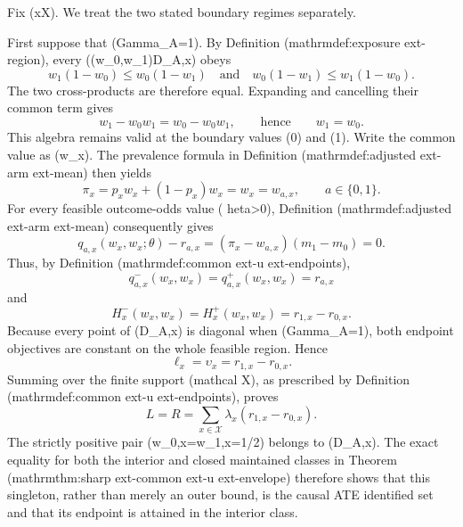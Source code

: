 Fix (x\in\mathcal X).  We treat the two stated boundary regimes separately.

First suppose that (Gamma_A=1).  By Definition (mathrm{def{:}exposure	ext{-}region}), every ((w_0,w_1)\in D_{A,x}) obeys
\[
w_1(1-w_0)\leq w_0(1-w_1)
\quad\text{and}\quad
w_0(1-w_1)\leq w_1(1-w_0).
\]
The two cross-products are therefore equal.  Expanding and cancelling their common term gives
\[
w_1-w_0w_1=w_0-w_0w_1,
\qquad\text{hence}\qquad
w_1=w_0.
\]
This algebra remains valid at the boundary values (0) and (1).  Write the common value as (w_x).  The prevalence formula in Definition (mathrm{def{:}adjusted	ext{-}arm	ext{-}mean}) then yields
\[
\pi_x=p_xw_x+(1-p_x)w_x=w_x=w_{a,x},
\qquad a\in\{0,1\}.
\]
For every feasible outcome-odds value (	heta>0), Definition (mathrm{def{:}adjusted	ext{-}arm	ext{-}mean}) consequently gives
\[
q_{a,x}(w_x,w_x;\theta)-r_{a,x}
=(\pi_x-w_{a,x})(m_1-m_0)=0.
\]
Thus, by Definition (mathrm{def{:}common	ext{-}u	ext{-}endpoints}),
\[
q^-_{a,x}(w_x,w_x)=q^+_{a,x}(w_x,w_x)=r_{a,x}
\]
and
\[
H^-_x(w_x,w_x)=H^+_x(w_x,w_x)=r_{1,x}-r_{0,x}.
\]
Because every point of (D_{A,x}) is diagonal when (Gamma_A=1), both endpoint objectives are constant on the whole feasible region.  Hence
\[
\ell_x=\upsilon_x=r_{1,x}-r_{0,x}.
\]
Summing over the finite support (mathcal X), as prescribed by Definition (mathrm{def{:}common	ext{-}u	ext{-}endpoints}), proves
\[
L=R=\sum_{x\in\mathcal X}\lambda_x(r_{1,x}-r_{0,x}).
\]
The strictly positive pair (w_{0,x}=w_{1,x}=1/2) belongs to (D_{A,x}).  The exact equality for both the interior and closed maintained classes in Theorem (mathrm{thm{:}sharp	ext{-}common	ext{-}u	ext{-}envelope}) therefore shows that this singleton, rather than merely an outer bound, is the causal ATE identified set and that its endpoint is attained in the interior class.

